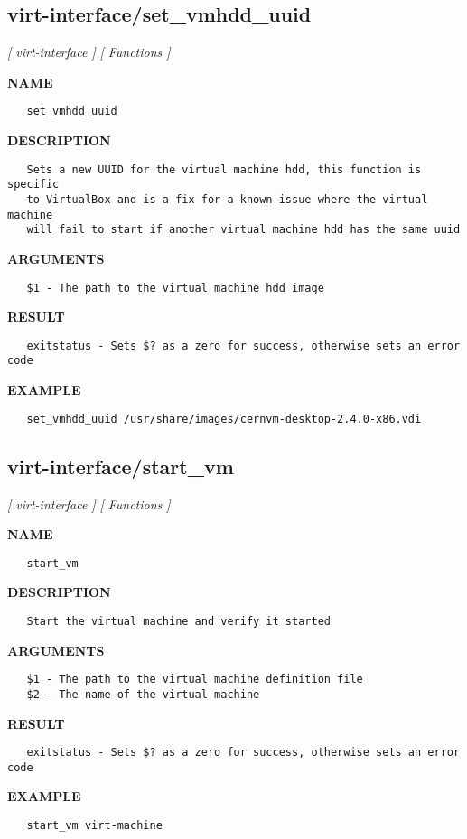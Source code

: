 \subsection{virt-interface/set\_vmhdd\_uuid}
\textsl{[ virt-interface ]}
\textsl{[ Functions ]}

\label{ch:robo66}
\label{ch:virt_interface_set_vmhdd_uuid}
\textbf{NAME}
\begin{verbatim}
   set_vmhdd_uuid
\end{verbatim}
\textbf{DESCRIPTION}
\begin{verbatim}
   Sets a new UUID for the virtual machine hdd, this function is specific
   to VirtualBox and is a fix for a known issue where the virtual machine
   will fail to start if another virtual machine hdd has the same uuid
\end{verbatim}
\textbf{ARGUMENTS}
\begin{verbatim}
   $1 - The path to the virtual machine hdd image
\end{verbatim}
\textbf{RESULT}
\begin{verbatim}
   exitstatus - Sets $? as a zero for success, otherwise sets an error code
\end{verbatim}
\textbf{EXAMPLE}
\begin{verbatim}
   set_vmhdd_uuid /usr/share/images/cernvm-desktop-2.4.0-x86.vdi
\end{verbatim}
\newpage
\subsection{virt-interface/start\_vm}
\textsl{[ virt-interface ]}
\textsl{[ Functions ]}

\label{ch:robo67}
\label{ch:virt_interface_start_vm}
\textbf{NAME}
\begin{verbatim}
   start_vm
\end{verbatim}
\textbf{DESCRIPTION}
\begin{verbatim}
   Start the virtual machine and verify it started
\end{verbatim}
\textbf{ARGUMENTS}
\begin{verbatim}
   $1 - The path to the virtual machine definition file
   $2 - The name of the virtual machine
\end{verbatim}
\textbf{RESULT}
\begin{verbatim}
   exitstatus - Sets $? as a zero for success, otherwise sets an error code
\end{verbatim}
\textbf{EXAMPLE}
\begin{verbatim}
   start_vm virt-machine
\end{verbatim}
\newpage
